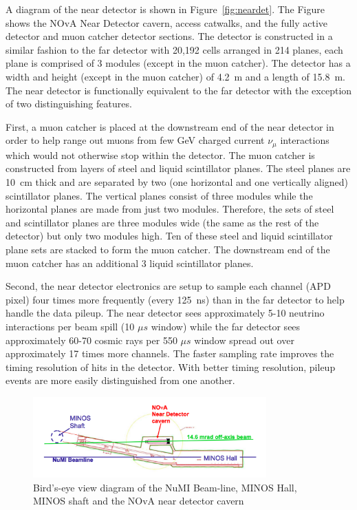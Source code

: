 A diagram of the near detector is shown in
Figure~\ref{fig:neardet}. The Figure shows the NOvA Near Detector
cavern, access catwalks, and the fully active detector and muon catcher
detector sections.
The detector is constructed in a similar fashion to the far detector
with 20,192 cells arranged in 214 planes, each plane is comprised of 3
modules (except in the muon catcher). The detector has a width and
height (except in the muon catcher) of 4.2~m and a length of
15.8~m. The near detector is
functionally equivalent to the far detector with the exception of two
distinguishing features.

First, a muon catcher is placed at the downstream end of the near
detector in order to help range out muons
from few GeV charged current $\nu_{\mu}$ interactions which would not
otherwise stop within the detector.
The muon catcher is constructed from layers of steel and liquid
scintillator planes. The steel planes are 10~cm
thick and are separated by 
two (one horizontal and one vertically aligned) scintillator planes.
The vertical planes consist of
three modules while the horizontal planes are made from just two
modules. Therefore, the sets of steel and scintillator planes are
three modules wide (the same as the rest of the detector) but only
two modules high. Ten of these steel and
liquid scintillator plane sets are stacked to form the muon
catcher. The downstream end of the muon catcher has an additional 3
liquid scintillator planes.

Second, the near detector electronics are setup to sample each channel
(APD pixel)
four times more frequently (every 125~ns) than in the far 
detector to help handle the data pileup. 
The near detector sees approximately 5-10 neutrino interactions per
beam spill (10 $\mu s$ window) while the far detector sees
approximately 60-70 cosmic rays per 550 $\mu s$ window spread out over
approximately 17 times more channels. The faster sampling rate
improves the timing resolution of hits in the detector. With better
timing resolution, pileup events are more easily distinguished from one
another. 




\begin{figure}
  \centering
  \includegraphics[width=0.8\textwidth]{../../img/baird/det/neardet_cavern_diagram.png}
  \caption{Bird's-eye view diagram of the NuMI Beam-line, MINOS Hall, MINOS
    shaft and the NOvA near detector cavern }
  \label{fig:cavern}
\end{figure}

